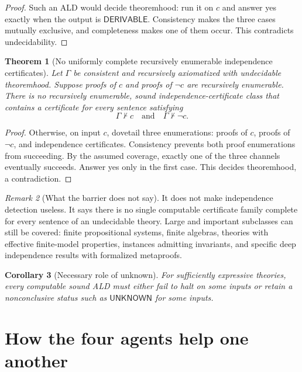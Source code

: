 \documentclass[11pt]{article}
\newtheorem{theorem}{Theorem}[section]
\newtheorem{corollary}[theorem]{Corollary}
\theoremstyle{definition}
\theoremstyle{remark}
\newtheorem{remark}[theorem]{Remark}
\newcommand{\Unknown}{\mathsf{UNKNOWN}}
\newcommand{\Der}{\mathsf{DERIVABLE}}
\newcommand{\Gammaa}{\Gamma}
\begin{document}
\begin{proof}
Such an ALD would decide theoremhood: run it on $c$ and answer yes exactly when the output is $\Der$. Consistency makes the three cases mutually exclusive, and completeness makes one of them occur. This contradicts undecidability.
\end{proof}

\begin{theorem}[No uniformly complete recursively enumerable independence certificates]
Let $\Gammaa$ be consistent and recursively axiomatized with undecidable theoremhood. Suppose proofs of $c$ and proofs of $\neg c$ are recursively enumerable. There is no recursively enumerable, sound independence-certificate class that contains a certificate for every sentence satisfying
\[
\Gammaa\nvdash c\quad\text{and}\quad\Gammaa\nvdash\neg c.
\]
\end{theorem}

\begin{proof}
Otherwise, on input $c$, dovetail three enumerations: proofs of $c$, proofs of $\neg c$, and independence certificates. Consistency prevents both proof enumerations from succeeding. By the assumed coverage, exactly one of the three channels eventually succeeds. Answer yes only in the first case. This decides theoremhood, a contradiction.
\end{proof}

\begin{remark}[What the barrier does not say]
It does not make independence detection useless. It says there is no single computable certificate family complete for every sentence of an undecidable theory. Large and important subclasses can still be covered: finite propositional systems, finite algebras, theories with effective finite-model properties, instances admitting invariants, and specific deep independence results with formalized metaproofs.
\end{remark}

\begin{corollary}[Necessary role of unknown]
For sufficiently expressive theories, every computable sound ALD must either fail to halt on some inputs or retain a nonconclusive status such as $\Unknown$ for some inputs.
\end{corollary}

\section{How the four agents help one another}
\end{document}
